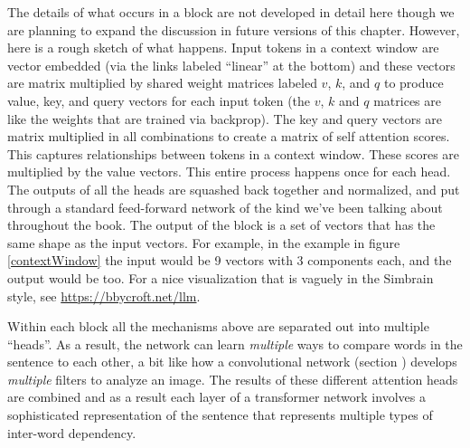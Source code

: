 The details of what occurs in a block are not developed in detail here though we are planning to expand the discussion in future versions of this chapter. However, here is a rough sketch of what happens. Input tokens in a context window are vector embedded (via the links labeled ``linear'' at the bottom) and these vectors are matrix multiplied by shared weight matrices labeled $v$, $k$, and $q$ to produce value, key, and query vectors for each input token (the $v$, $k$ and $q$ matrices are like the weights that are trained via backprop). The key and query vectors are matrix multiplied in all combinations to create a matrix of self attention scores. This captures relationships between tokens in a context window. These scores are multiplied by the value vectors. This entire process happens once for each head. The outputs of all the heads are squashed back together and normalized, and put through a standard feed-forward network of the kind we've been talking about throughout the book. The output of the block is a set of vectors that has the same shape as the input vectors.  For example, in the example in figure \ref{contextWindow} the input would be 9 vectors with 3 components each, and the output would be too. For a nice visualization that is vaguely in the Simbrain style, see \url{https://bbycroft.net/llm}.

Within each block all the mechanisms above are separated out into multiple ``heads''. As a result, the network can learn \emph{multiple} ways to compare words in the sentence to each other, a bit like how a convolutional network (section ) develops \emph{multiple} filters to analyze an image.  The results of these different attention heads are combined and as a result each layer of a transformer network involves a sophisticated representation of the sentence that represents multiple types of inter-word dependency.

